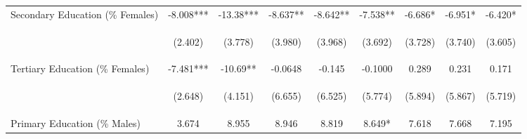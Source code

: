 \begin{landscape}
\begin{table}[htpb!]
\begin{center}
\begin{tabular}{lcccccccc}
Secondary Education (\% Females) &-8.008***&-13.38***&-8.637**&-8.642**&-7.538**&-6.686*&-6.951*&-6.420*\\
&\begin{footnotesize}(2.402)\end{footnotesize}&\begin{footnotesize}(3.778)\end{footnotesize}&\begin{footnotesize}(3.980)\end{footnotesize}&\begin{footnotesize}(3.968)\end{footnotesize}&\begin{footnotesize}(3.692)\end{footnotesize}&\begin{footnotesize}(3.728)\end{footnotesize}&\begin{footnotesize}(3.740)\end{footnotesize}&\begin{footnotesize}(3.605)\end{footnotesize}\\
Tertiary Education (\% Females) &-7.481***&-10.69**&-0.0648&-0.145&-0.1000&0.289&0.231&0.171\\
&\begin{footnotesize}(2.648)\end{footnotesize}&\begin{footnotesize}(4.151)\end{footnotesize}&\begin{footnotesize}(6.655)\end{footnotesize}&\begin{footnotesize}(6.525)\end{footnotesize}&\begin{footnotesize}(5.774)\end{footnotesize}&\begin{footnotesize}(5.894)\end{footnotesize}&\begin{footnotesize}(5.867)\end{footnotesize}&\begin{footnotesize}(5.719)\end{footnotesize}\\
Primary Education (\% Males) &3.674&8.955&8.946&8.819&8.649*&7.618&7.668&7.195\\

\end{tabular}
\end{center}
\end{table}
\end{landscape}
